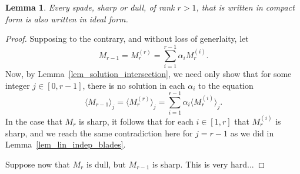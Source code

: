 \documentclass{birkjour}
\newtheorem{lem}[thm]{Lemma}
\theoremstyle{definition}
\theoremstyle{remark}
\numberwithin{equation}{section}
\begin{document}

\begin{lem}\label{lem_lin_indep_spades}
Every spade, sharp or dull, of rank $r>1$, that is written in compact form is also written in ideal form.
\end{lem}
\begin{proof}
Supposing to the contrary, and without loss of generlaity, let
\begin{equation*}
M_{r-1} = M_r^{(r)} = \sum_{i=1}^{r-1}\alpha_i M_r^{(i)}.
\end{equation*}
Now, by Lemma~\ref{lem_solution_intersection}, we need only show that
for some integer $j\in[0,r-1]$, there is no solution in each $\alpha_i$ to the equation
\begin{equation*}
\langle M_{r-1}\rangle_j = \langle M_r^{(r)}\rangle_j = \sum_{i=1}^{r-1}\alpha_i \langle M_r^{(i)}\rangle_j.
\end{equation*}
In the case that $M_r$ is sharp, it follows that for each $i\in[1,r]$ that $M_r^{(i)}$ is sharp, and
we reach the same contradiction here for $j=r-1$ as we did in Lemma~\ref{lem_lin_indep_blades}.

Suppose now that $M_r$ is dull, but $M_{r-1}$ is sharp.  This is very hard...

\end{proof}
\end{document}

